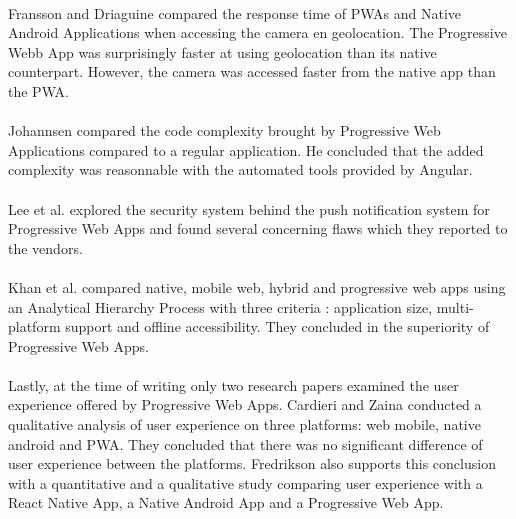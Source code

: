 \documentclass{kththesis}
\begin{document}
\paragraph{}
Fransson and Driaguine \cite{PWAbc_responsetime} compared the response time of PWAs and Native Android Applications when accessing the camera en geolocation. The Progressive Webb App was surprisingly faster at using geolocation than its native counterpart. However, the camera was accessed faster from the native app than the PWA.

\paragraph{}
Johannsen \cite{JohannsenFabian2018PWAa} compared the code complexity brought by Progressive Web Applications compared to a regular application. He concluded that the added complexity was reasonnable with the automated tools provided by Angular.  

\paragraph{}
Lee et al. \cite{Pride_Prejudice} explored the security system behind the push notification system for Progressive Web Apps and found several concerning flaws which they reported to the vendors.

\paragraph{}
Khan et al. \cite{pwa_ahp} compared native, mobile web, hybrid and progressive web apps using an Analytical Hierarchy Process with three criteria : application size, multi-platform support and offline accessibility. They concluded in the superiority of Progressive Web Apps.  

\paragraph{}
Lastly, at the time of writing only two research papers examined the user experience offered by Progressive Web Apps. Cardieri and Zaina \cite{PWA_UX_comparison_study} conducted a qualitative analysis of user experience on three platforms: web mobile, native android and PWA. They concluded that there was no significant difference of user experience between the platforms. Fredrikson \cite{emulating_native_w_crossplatform} also supports this conclusion with a quantitative and a qualitative study comparing user experience with a React Native App, a Native Android App and a Progressive Web App. 
\end{document}
